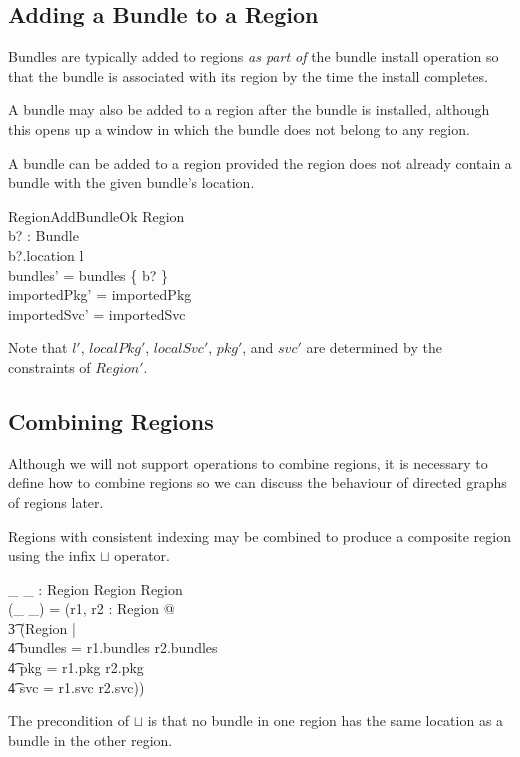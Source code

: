 \documentclass[a4paper,9pt]{article}
\begin{document}
\subsection{Adding a Bundle to a Region}

Bundles are typically added to regions \textit{as part of} the bundle install operation
so that the bundle is associated with its region by the time the
install completes.

A bundle may also be added to a region after the bundle is installed, although this opens up a window in
which the bundle does not belong to any region.

A bundle can be added to a region provided the region does not already contain a bundle with
the given bundle's location.
\begin{schema}{RegionAddBundleOk}
  \Delta Region \\
  b? : Bundle \\
\where
  b?.location \notin \dom l \\
  bundles' = bundles \cup \{ b? \} \\
  importedPkg' = importedPkg \\
  importedSvc' = importedSvc \\
\end{schema}
Note that $l'$, $localPkg'$, $localSvc'$, $pkg'$, and $svc'$ are determined by the constraints of $Region'$.

\subsection{Combining Regions}

Although we will not support operations to combine regions, it is necessary to define how to combine
regions so we can discuss the behaviour of directed graphs of regions later.

Regions with consistent indexing may be combined to produce a composite region using the infix $\sqcup$ operator.
\begin{axdef}
 \_ \sqcup \_ : Region \cross Region \pfun Region \\
\where
 (\_ \sqcup \_) = (\lambda r1, r2 : Region @ \\
\t3 (\mu Region | \\
\t4 bundles = r1.bundles \cup r2.bundles \land \\
\t4 pkg = r1.pkg \cup r2.pkg \land \\
\t4 svc = r1.svc \cup r2.svc)) \\
\end{axdef}
The precondition of $\sqcup$ is that no bundle in one region has the same location as a bundle in the other region.
\end{document}
